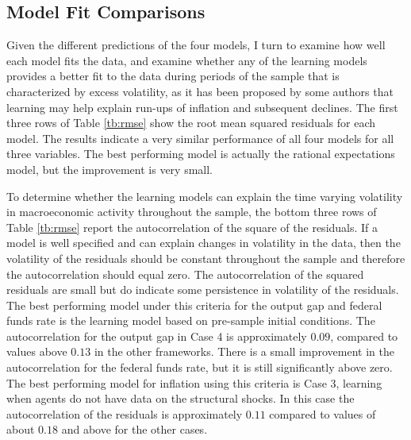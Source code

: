 \documentclass[11pt]{article}
\begin{document}
\subsection{Model Fit Comparisons}

Given the different predictions of the four models, I turn to examine how well each model fits the data, and examine whether any of the learning models provides a better fit to the data during periods of the sample that is characterized by excess volatility, as it has been proposed by some authors that learning may help explain run-ups of inflation and subsequent declines.  The first three rows of Table \ref{tb:rmse} show the root mean squared residuals for each model.  The results indicate a very similar performance of all four models for all three variables.  The best performing model is actually the rational expectations model, but the improvement is very small.  

To determine whether the learning models can explain the time varying volatility in macroeconomic activity throughout the sample, the bottom three rows of Table \ref{tb:rmse} report the autocorrelation of the square of the residuals.  If a model is well specified and can explain changes in volatility in the data, then the volatility of the residuals should be constant throughout the sample and therefore the autocorrelation should equal zero.  The autocorrelation of the squared residuals are small but do indicate some persistence in volatility of the residuals.  The best performing model under this criteria for the output gap and federal funds rate is the learning model based on pre-sample initial conditions.  The autocorrelation for the output gap in Case 4 is approximately $0.09$, compared to values above $0.13$ in the other frameworks.  There is a small improvement in the autocorrelation for the federal funds rate, but it is still significantly above zero.  The best performing model for inflation using this criteria is Case 3, learning when agents do not have data on the structural shocks.  In this case the autocorrelation of the residuals is approximately $0.11$ compared to values of about $0.18$ and above for the other cases.
\end{document}
